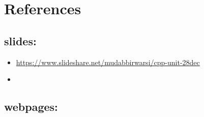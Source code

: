 \documentclass[10pt,a4paper,onecolumn,notitlepage]{article}
\begin{document}
\section*{References}
\subsection*{slides:}
\begin{itemize}
\item \hyperref[https://www.slideshare.net/mudabbirwarsi/cpp-unit-28dec]{https://www.slideshare.net/mudabbirwarsi/cpp-unit-28dec}
\item 
\end{itemize}
\subsection*{webpages:}
\end{document}
